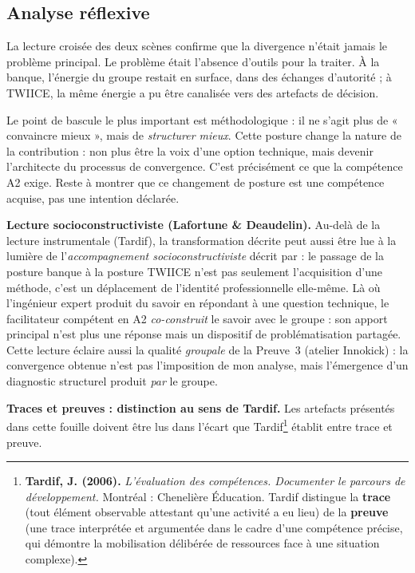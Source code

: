 \subsection{Analyse réflexive}

La lecture croisée des deux scènes confirme que la divergence n'était jamais le problème principal. Le problème était l'absence d'outils pour la traiter. À la banque, l'énergie du groupe restait en surface, dans des échanges d'autorité ; à TWIICE, la même énergie a pu être canalisée vers des artefacts de décision.

Le point de bascule le plus important est méthodologique : il ne s'agit plus de « convaincre mieux », mais de \textit{structurer mieux}. Cette posture change la nature de la contribution : non plus être la voix d'une option technique, mais devenir l'architecte du processus de convergence. C'est précisément ce que la compétence A2 exige. Reste à montrer que ce changement de posture est une compétence acquise, pas une intention déclarée.

\medskip

\textbf{Lecture socioconstructiviste (Lafortune \& Deaudelin).}
Au-delà de la lecture instrumentale (Tardif), la transformation décrite peut aussi être lue à la lumière de l'\emph{accompagnement socioconstructiviste} décrit par \citet{lafortune2001} : le passage de la posture banque à la posture TWIICE n'est pas seulement l'acquisition d'une méthode, c'est un déplacement de l'identité professionnelle elle-même. Là où l'ingénieur expert produit du savoir en répondant à une question technique, le facilitateur compétent en A2 \emph{co-construit} le savoir avec le groupe : son apport principal n'est plus une réponse mais un dispositif de problématisation partagée. Cette lecture éclaire aussi la qualité \emph{groupale} de la Preuve~3 (atelier Innokick) : la convergence obtenue n'est pas l'imposition de mon analyse, mais l'émergence d'un diagnostic structurel produit \emph{par} le groupe.

\medskip

\textbf{Traces et preuves : distinction au sens de Tardif.}
Les artefacts présentés dans cette fouille doivent être lus dans l'écart que Tardif\footnote{\textbf{Tardif, J. (2006).} \textit{L'évaluation des compétences. Documenter le parcours de développement.} Montréal : Chenelière Éducation. Tardif distingue la \textbf{trace} (tout élément observable attestant qu'une activité a eu lieu) de la \textbf{preuve} (une trace interprétée et argumentée dans le cadre d'une compétence précise, qui démontre la mobilisation délibérée de ressources face à une situation complexe).} établit entre trace et preuve.

